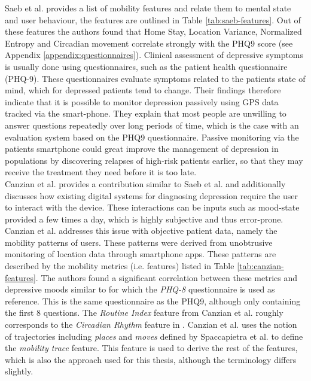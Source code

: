Saeb et al. provides a list of mobility features and relate them to mental state and user behaviour, the features are outlined in Table \ref{tab:saeb-features}. Out of these features the authors found that Home Stay, Location Variance, Normalized Entropy and Circadian movement correlate strongly with the PHQ9 score (see Appendix \ref{appendix:questionnaires}). Clinical assessment of depressive symptoms is usually done using questionnaires, such as the patient health questionnaire (PHQ-9). These questionnaires evaluate symptoms related to the patients state of mind, which for depressed patients tend to change. Their findings therefore indicate that it is possible to monitor depression passively using GPS data tracked via the smart-phone. They explain that most people are unwilling to answer questions repeatedly over long periods of time, which is the case with an evaluation system based on the PHQ9 questionnaire. Passive monitoring via the patients smartphone could great improve the management of depression in populations by discovering relapses of high-risk patients earlier, so that they may receive the treatment they need before it is too late. \\



Canzian et al. provides a contribution similar to Saeb et al. and additionally discusses how existing digital systems for diagnosing depression require the user to interact with the device. These interactions can be inputs such as mood-state provided a few times a day, which is highly subjective and thus error-prone. Canzian et al. addresses this issue with objective patient data, namely the mobility patterns of users. These patterns were derived from unobtrusive monitoring of location data through smartphone apps. These patterns are described by the mobility metrics (i.e. features) listed in Table \ref{tab:canzian-features}. The authors found a significant correlation between these metrics and depressive moods similar to \cite{Saeb2015} for which the \textit{PHQ-8} questionnaire is used as  reference. This is the same questionnaire as the PHQ9, although only containing the first 8 questions. The \textit{Routine Index} feature from Canzian et al. roughly corresponds to the \textit{Circadian Rhythm} feature in \cite{Saeb2015}. Canzian et al. \cite{Canzian2015} uses the notion of trajectories including \textit{places} and \textit{moves} defined by Spaccapietra et al. \cite{trajectories2008} to define the \textit{mobility trace} feature. This feature is used to derive the rest of the features, which is also the approach used for this thesis, although the terminology differs slightly.\\

